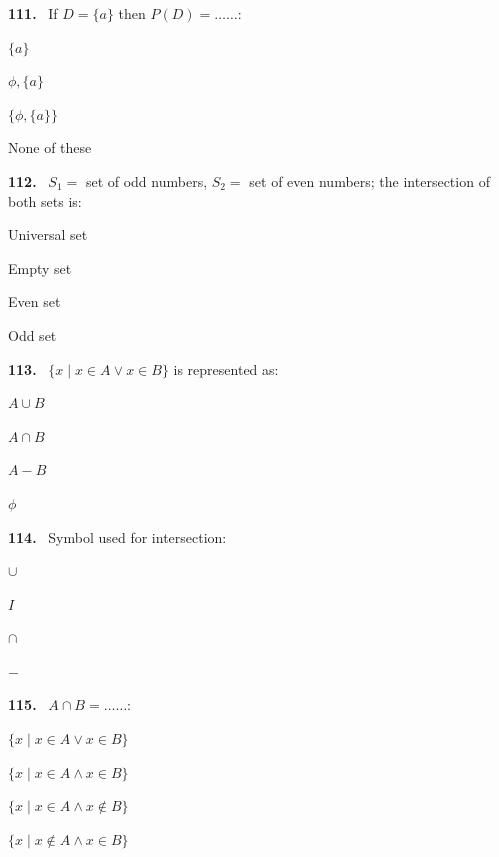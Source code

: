 \documentclass[11pt]{article}
\newenvironment{qenv}[1]{%
  \par\medskip\noindent\textbf{#1.}\ \ignorespaces
}{\par}
\begin{document}
\begin{qenv}{111} If $D=\{a\}$ then $P(D) = \ldots\ldots$:
\begin{options} \item $\{a\}$ \item $\phi,\{a\}$ \item $\{\phi,\{a\}\}$ \item None of these \end{options} \end{qenv}

\begin{qenv}{112} $S_1=$ set of odd numbers, $S_2=$ set of even numbers; the intersection of both sets is:
\begin{options} \item Universal set \item Empty set \item Even set \item Odd set \end{options} \end{qenv}

\begin{qenv}{113} $\{x \mid x\in A \lor x\in B\}$ is represented as:
\begin{options} \item $A\cup B$ \item $A\cap B$ \item $A-B$ \item $\phi$ \end{options} \end{qenv}

\begin{qenv}{114} Symbol used for intersection:
\begin{options} \item $\cup$ \item $I$ \item $\cap$ \item $-$ \end{options} \end{qenv}

\begin{qenv}{115} $A\cap B = \ldots\ldots$:
\begin{options} \item $\{x \mid x\in A \lor x\in B\}$ \item $\{x \mid x\in A \land x\in B\}$ \item $\{x \mid x\in A \land x\notin B\}$ \item $\{x \mid x\notin A \land x\in B\}$ \end{options} \end{qenv}
\end{document}
